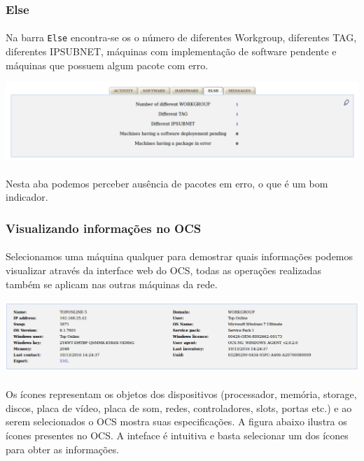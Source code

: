 \documentclass[a4paper]{article}
\begin{document}
    \subsubsection{Else}
    \paragraph{}
    Na barra \texttt{Else} encontra-se os o número de diferentes Workgroup, diferentes TAG, diferentes IPSUBNET, máquinas com implementação de software pendente e máquinas que possuem algum pacote com erro.
    
        \includegraphics[scale = 0.3]{else.png}\\
	\paragraph{}
   	 Nesta aba podemos perceber ausência de pacotes em erro, o que é um bom indicador.
	\subsubsection{Visualizando informações no OCS}
    \paragraph{}
	Selecionamos uma máquina qualquer para demostrar quais informações podemos visualizar através da interface web do OCS, todas as operações realizadas também se aplicam nas outras máquinas da rede.
    
	\includegraphics[scale = 0.48]{machine.png}\\
    
  \paragraph{} Os ícones representam os objetos dos dispositivos (processador, memória, storage, discos, placa de vídeo, placa de som, redes, controladores, slots, portas etc.) e ao serem selecionados o OCS mostra suas especificações. A figura abaixo ilustra os ícones presentes no OCS. A inteface é intuitiva e basta selecionar um dos ícones para obter as informações.
  
\end{document}
